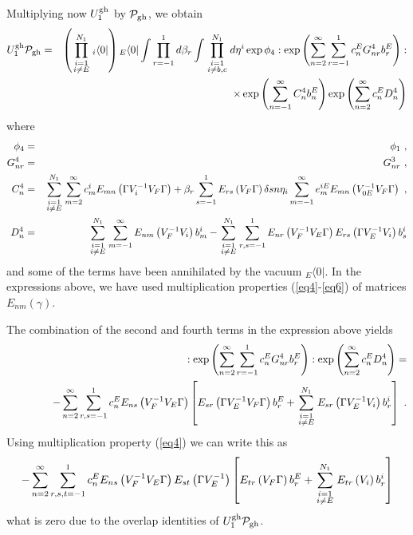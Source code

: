 \documentclass[a4paper,11pt]{article}
\begin{document}
Multiplying now $U^{\rm gh}_1$ by ${\cal P}_{\rm gh}$, we obtain
\begin{eqnarray}
U^{\rm gh}_1{\cal P}_{\rm gh} & = & \left( \prod_{\scriptstyle i=1\atop \scriptstyle i\neq E}^{N_1}{ }_i\langle 0|\right) { }_E\langle 0|\int \prod_{r=-1}^1d\beta _r\int \prod_{\scriptstyle i=1\atop \scriptstyle i\neq b,c}^{N_1}d\eta ^i \exp {\phi _4}:\exp \left( \sum_{n=2}^\infty \sum_{r=-1}^1c_n^EG_{nr}^4b_r^E\right) :\nonumber \\
 & & \times \exp \left( \sum_{n=-1}^\infty C_n^4b_n^E\right) \exp \left( \sum_{n=2}^\infty c_n^ED_n^4\right) 
\end{eqnarray}
where
\begin{eqnarray}
\phi _4 & = & \phi _1\ ,\\ 
G_{nr}^4 & = & G_{nr}^3\ ,\\ 
C_n^4 & = & \sum_{\scriptstyle i=1\atop \scriptstyle i \neq E}^{N_1} \sum_{m=2}^\infty c_m^i E_{mn} \left( \Gamma V^{-1}_i V_F \Gamma \right) +\beta _r \sum_{s=-1}^1 E_{rs} \left( V_F\Gamma \right) \delta {sn} \eta _i \sum_{m=-1}^\infty e_m^{iE} E_{mn} \left( V_{0E}^{-1} V_F\Gamma \right) \ ,\\ 
D_n^4 & = & \sum_{\scriptstyle i=1\atop \scriptstyle i \neq E}^{N_1} \sum_{m=-1}^\infty E_{nm} \left( V^{-1}_F V_i\right) b_m^i -\sum_{\scriptstyle i=1\atop \scriptstyle i\neq E}^{N_1} \sum_{r,s=-1}^1 E_{nr} \left( V^{-1}_FV_E \Gamma \right) E_{rs} \left( \Gamma V^{-1}_E V_i\right) b_s^i
\end{eqnarray}
and some of the terms have been annihilated by the vacuum ${ }_E\langle 0|$. In the expressions above, we have used multiplication properties (\ref{eq4}-\ref{eq6}) of matrices $E_{nm}(\gamma )$.

The combination of the second and fourth terms in the expression above yields
\begin{eqnarray}
 & & :\exp \left( \sum_{n=2}^\infty \sum_{r=-1}^1c_n^EG_{nr}^4b_r^E\right) :\exp \left( \sum_{n=2}^\infty c_n^ED_n^4\right) = \nonumber \\ 
 & & \ \ \ \ \ \ \ \ \ \ -\sum_{n=2}^\infty \sum_{r,s=-1}^1c_n^EE_{ns}\left( V_F^{-1}V_E\Gamma \right) \left[ E_{sr}\left( \Gamma V_E^{-1}V_F\Gamma \right) b_r^E+\sum_{\scriptstyle i=1\atop \scriptstyle i\neq E}^{N_1}E_{sr}\left( \Gamma V_E^{-1}V_i\right) b_r^i\right] \ .
\end{eqnarray}
Using multiplication property (\ref{eq4}) we can write this as
\begin{equation}
-\sum_{n=2}^\infty \sum_{r,s,t=-1}^1c_n^EE_{ns}\left( V_F^{-1}V_E\Gamma \right) E_{st}\left( \Gamma V_E^{-1}\right) \left[ E_{tr}\left( V_F\Gamma \right) b_r^E+\sum_{\scriptstyle i=1\atop \scriptstyle i\neq E}^{N_1}E_{tr}\left( V_i\right) b_r^i\right] 
\end{equation}
what is zero due to the overlap identities of $U_1^{\rm gh}{\cal P}_{\rm gh}$.
\end{document}
